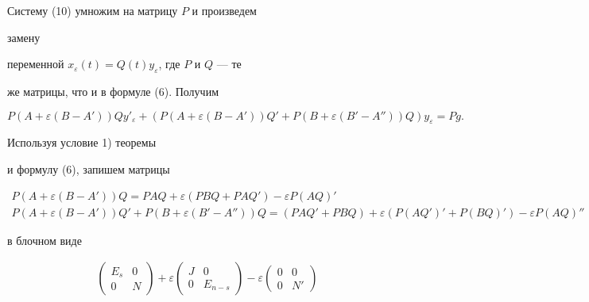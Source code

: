 \begin{pf} Систему (10) умножим на матрицу $P$ и произведем


замену


переменной $x_\varepsilon(t)=Q(t)y_\varepsilon$, где $P$ и $Q$ --- те


же матрицы, что и в формуле (6). Получим


$$


P(A+\varepsilon(B-A'))Qy'_\varepsilon+(P(A+\varepsilon(B-A'))Q'+


P(B+\varepsilon(B'-A''))Q)y_\varepsilon=Pg.


$$


Используя условие 1) теоремы


и формулу (6), запишем матрицы


\begin{gather*}


P(A+\varepsilon(B-A'))Q=PAQ+\varepsilon(PBQ+PAQ')-


\varepsilon P(AQ)'\\


P(A+\varepsilon(B-A'))Q'+P(B+\varepsilon(B'-A''))Q=


(PAQ'+PBQ)+\varepsilon(P(AQ')'+P(BQ)')-


\varepsilon P(AQ)''


\end{gather*}


в блочном виде


\begin{gather*}


\begin{pmatrix}


E_s & 0\\


0 & N


\end{pmatrix}


+\varepsilon


\begin{pmatrix}


J & 0\\


0 & E_{n-s}


\end{pmatrix}


-\varepsilon


\begin{pmatrix}


0 & 0\\


0 & N'



\end{pmatrix}
\end{gather*}
\end{pf}
